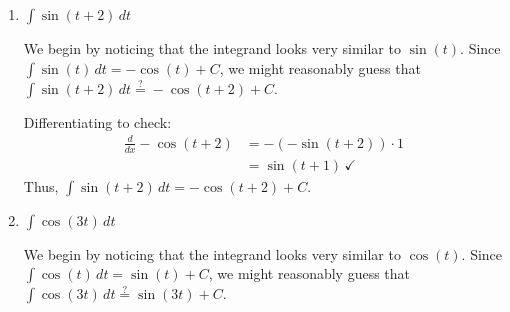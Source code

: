 \documentclass[main]{subfiles}
\begin{document}
\begin{enumerate}[resume,topsep=0pt]
\begin{enumerate}[topsep=0pt]
    \begin{solution}
        We begin by noticing that the integrand looks very similar to
        $\dfrac{1}{t}$. Since $\displaystyle \int \frac{1}{t}\,dt
        = \ln|t|+C$, we might reasonably guess that 
        $\displaystyle \int \frac{1}{1+t}\,dt
        \stackrel{?}{=} \ln|1+t|+C$.
        
        Differentiating to check:
        \begin{align*}
            \frac{d}{dx} \ln|1+t| &= \frac{1}{1+t} \cdot 1 \\
            & = \frac{1}{1+t}\, \checkmark
        \end{align*}
        Thus, $\displaystyle \int \frac{1}{1+t}\,dt
        = \boxed{\ln|1+t|+C.}$
    \end{solution}
    
    \item 
    \begin{problem}[\vfill]
        $\displaystyle \int\sin(t+2)\,dt$
    \end{problem}

    \begin{solution}
        We begin by noticing that the integrand looks very similar to
        $\sin(t)$. Since $\displaystyle \int \sin(t)\,dt
        = -\cos(t)+C$, we might reasonably guess that 
        $\displaystyle \int \sin(t+2)\,dt
        \stackrel{?}{=} -\cos(t+2)+C$.
        
        Differentiating to check:
        \begin{align*}
            \frac{d}{dx} -\cos(t+2) &= -(-\sin(t+2)) \cdot 1 \\
            & = \sin(t+1)\, \checkmark
        \end{align*}
        Thus, $\displaystyle \int \sin(t+2)\,dt
        = \boxed{-\cos(t+2)+C.}$
    \end{solution}
    
    \item
    \begin{problem}[\vfill]
        $\displaystyle \int\cos(3t)\,dt$
    \end{problem}

    \begin{solution}
        We begin by noticing that the integrand looks very similar to
        $\cos(t)$. Since $\displaystyle \int \cos(t)\,dt
        = \sin(t)+C$, we might reasonably guess that 
        $\displaystyle \int \cos(3t)\,dt
        \stackrel{?}{=} \sin(3t)+C$.
        

\end{solution}
\end{enumerate}
\end{enumerate}
\end{document}

